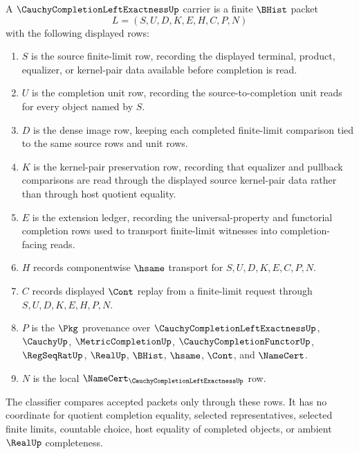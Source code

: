 \begin{definition}
\label{def:cauchy-completion-left-exactness-carrier}
A $\CauchyCompletionLeftExactnessUp$ carrier is a finite $\BHist$ packet
$$
L=(S,U,D,K,E,H,C,P,N)
$$
with the following displayed rows:
\begin{enumerate}
\item $S$ is the source finite-limit row, recording the displayed terminal, product, equalizer, or kernel-pair data available before completion is read.
\item $U$ is the completion unit row, recording the source-to-completion unit reads for every object named by $S$.
\item $D$ is the dense image row, keeping each completed finite-limit comparison tied to the same source rows and unit rows.
\item $K$ is the kernel-pair preservation row, recording that equalizer and pullback comparisons are read through the displayed source kernel-pair data rather than through host quotient equality.
\item $E$ is the extension ledger, recording the universal-property and functorial completion rows used to transport finite-limit witnesses into completion-facing reads.
\item $H$ records componentwise $\hsame$ transport for $S,U,D,K,E,C,P,N$.
\item $C$ records displayed $\Cont$ replay from a finite-limit request through $S,U,D,K,E,H,P,N$.
\item $P$ is the $\Pkg$ provenance over $\CauchyCompletionLeftExactnessUp$, $\CauchyUp$, $\MetricCompletionUp$, $\CauchyCompletionFunctorUp$, $\RegSeqRatUp$, $\RealUp$, $\BHist$, $\hsame$, $\Cont$, and $\NameCert$.
\item $N$ is the local $\NameCert_{\CauchyCompletionLeftExactnessUp}$ row.
\end{enumerate}
The classifier compares accepted packets only through these rows. It has no coordinate for quotient completion equality, selected representatives, selected finite limits, countable choice, host equality of completed objects, or ambient $\RealUp$ completeness.
\end{definition}

